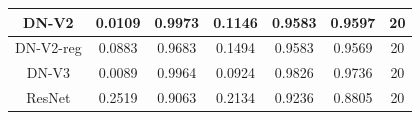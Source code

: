 \documentclass[11pt,a4paper]{article}
\theoremstyle{definition}
\begin{document}
\begin{table}[H]
\begin{tabular}{|c|c|c|c|c|c|c|}
\hline
DN-V2                                               & \textcolor[rgb]{0.129,0.129,0.129}{0.0109 } & \textcolor[rgb]{0.129,0.129,0.129}{0.9973 } & \textcolor[rgb]{0.129,0.129,0.129}{0.1146 }                                                                       & \textcolor[rgb]{0.129,0.129,0.129}{0.9583}                                                                             & \textcolor[rgb]{0.129,0.129,0.129}{0.9597}                                                                       & 20                                                                                                              \\
\hline
DN-V2-reg                                           & \textcolor[rgb]{0.129,0.129,0.129}{0.0883 } & \textcolor[rgb]{0.129,0.129,0.129}{0.9683 } & \textcolor[rgb]{0.129,0.129,0.129}{0.1494 }                                                                       & \textcolor[rgb]{0.129,0.129,0.129}{0.9583}                                                                             & \textcolor[rgb]{0.129,0.129,0.129}{0.9569}                                                                       & 20                                                                                                              \\
\hline
DN-V3                                               & \textcolor[rgb]{0.129,0.129,0.129}{0.0089 } & \textcolor[rgb]{0.129,0.129,0.129}{0.9964 } & \textcolor[rgb]{0.129,0.129,0.129}{0.0924 }                                                                       & \textcolor[rgb]{0.129,0.129,0.129}{0.9826}                                                                             & \textcolor[rgb]{0.129,0.129,0.129}{0.9736}                                                                       & 20                                                                                                              \\
\hline
\rowcolor{green} ResNet                                              & \textcolor[rgb]{0.129,0.129,0.129}{0.2519 } & \textcolor[rgb]{0.129,0.129,0.129}{0.9063 } & \textcolor[rgb]{0.129,0.129,0.129}{0.2134 }                                                                       & \textcolor[rgb]{0.129,0.129,0.129}{0.9236}                                                                             & \textcolor[rgb]{0.129,0.129,0.129}{0.8805}                                                                       & 20                                                                                                              \\
\hline


\end{tabular}
\end{table}
\end{document}
